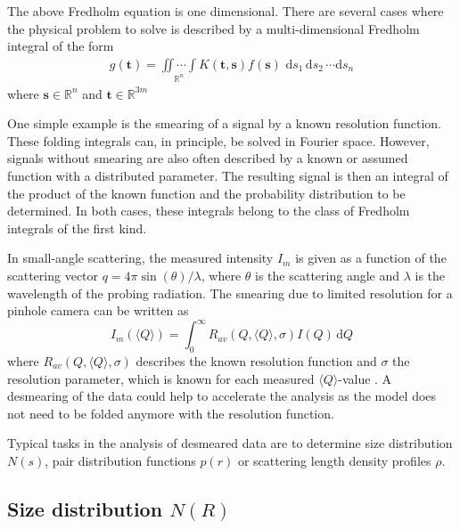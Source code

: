 The above Fredholm equation is one dimensional. There are several cases where the physical problem to solve is described by a multi-dimensional Fredholm integral of the form
\begin{align}
\label{eq:Fredholm}
g(\mathbf{t})=\underset{\mathds{R}^n}{\iint\cdots\int} K(\mathbf{t},\mathbf{s})f(\mathbf{s})\,\,\mathrm{d}s_1\,\mathrm{d}s_2\,\cdots \mathrm{d}s_n
\end{align}
where $\mathbf{s} \in \mathds{R}^n$ and $\mathbf{t} \in \mathds{R}^{3m}$

One simple example is the smearing of a signal by a known resolution function. These folding integrals can, in principle, be solved in Fourier space. However, signals without smearing are also often described by a known or assumed function with a distributed parameter. The resulting signal is then an integral of the product of the known function and the probability distribution to be determined. In both cases, these integrals belong to the class of Fredholm integrals of the first kind.

In small-angle scattering, the measured intensity $I_m$ is given as a function of the scattering vector $q=4\pi\sin(\theta)/\lambda$, where $\theta$ is the scattering angle and $\lambda$ is the wavelength of the probing radiation. The smearing due to limited resolution for a pinhole camera can be written as
\begin{equation} \label{eq:res}
I_m(\langle Q\rangle) = \int_0^\infty R_{av}\left(Q,\langle
Q\rangle,\sigma\right) I(Q) \, \mathrm{d}Q
\end{equation}
where $R_{av}\left(Q,\langle Q\rangle,\sigma\right)$ describes the known resolution function and $\sigma$ the resolution parameter, which is known for each measured $\langle Q\rangle$-value \cite{Pedersen1990}. A desmearing of the data could help to accelerate the analysis as the model does not need to be folded anymore with the resolution function.

Typical tasks in the analysis of desmeared data are to determine size distribution $N(s)$, pair distribution functions $p(r)$ or scattering length density profiles $\rho$.

\subsection{Size distribution $N(R)$}~\\
\label{sec:N(R)}

